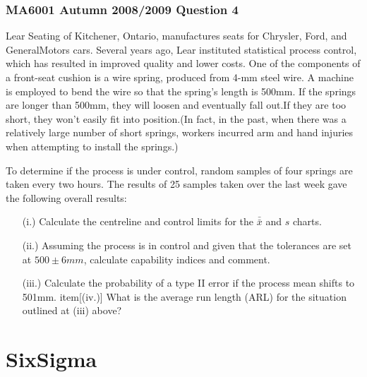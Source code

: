 \documentclass[MASTER-SPC.tex]{subfiles}
\begin{document}
\subsection{MA6001 Autumn 2008/2009 Question 4}


Lear Seating of Kitchener, Ontario, manufactures seats for Chrysler, Ford, and GeneralMotors cars. Several years ago, Lear instituted statistical process control, which has	resulted in improved quality and lower costs.  One of the components of a front-seat cushion is a wire spring, produced from 4-mm steel wire.  A machine is employed to 	bend the wire so that the spring's length is 500mm.  If the springs are longer than 500mm, they will loosen and eventually fall out.If they are too short, they won't easily fit into position.(In fact, in the past, when there was a relatively large number of short springs, workers incurred arm and hand injuries when attempting to install the 	
springs.)

To determine if the process is under control, random samples of four springs are taken every two hours.
The results of 25 samples taken over the last week gave the following overall results:

\begin{itemize}
	\item[(i.)]	Calculate the centreline and control limits for the $\bar{\bar{x}}$ and  $s$  charts.	
	
	\item[(ii.)] Assuming the process is in control and given that the tolerances are set at
	$500 \pm 6mm$, calculate capability indices and comment.	      
	
	\item[(iii.)] Calculate the probability of a type II error if the process
	mean shifts to 501mm.                                                                      
	item[(iv.)] What is the average run length (ARL) for the situation outlined at (iii)
	above?	
\end{itemize}


\newpage
\chapter{SixSigma}
\end{document}

